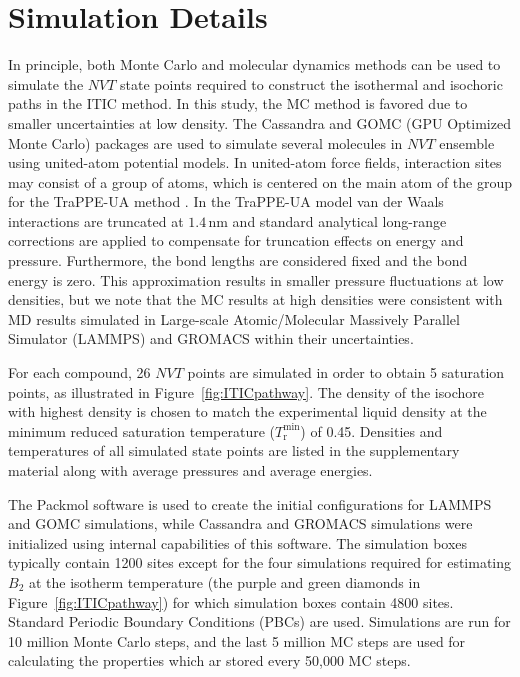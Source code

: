 \documentclass[5p,times]{elsarticle}
\begin{document}
\section{Simulation Details} \label{sec:SimDetail}
In principle, both Monte Carlo and molecular dynamics methods can be used to simulate the $NVT$ state points required to construct the isothermal and isochoric paths in the ITIC method. In this study, the MC method is favored due to smaller uncertainties at low density. The Cassandra \cite{Shah2017} and GOMC (GPU Optimized Monte Carlo) \cite{Mick2013} packages are used to simulate several molecules in $NVT$ ensemble using united-atom potential models. In united-atom force fields, interaction sites may consist of a group of atoms, which is centered on the main atom of the group for the TraPPE-UA method \cite{Smit1998}. In the TraPPE-UA model van der Waals interactions are truncated at $1.4\,\mathrm{nm}$ and standard analytical long-range corrections are applied to compensate for truncation effects on energy and pressure\cite{allen2017}. Furthermore, the bond lengths are considered fixed and the bond energy is zero. This approximation results in smaller pressure fluctuations at low densities, but we note that the MC results at high densities were consistent with MD results simulated in Large-scale Atomic/Molecular Massively Parallel Simulator (LAMMPS) \cite{Plimpton2007} and GROMACS \cite{Lindahl2001} within their uncertainties.

For each compound, 26 $NVT$ points are simulated in order to obtain 5 saturation points, as illustrated in Figure~\ref{fig:ITICpathway}. The density of the isochore with highest density is chosen to match the experimental liquid density at the minimum reduced saturation temperature ($T_\mathrm{r}^\mathrm{min}$) of 0.45. Densities and temperatures of all simulated state points are listed in the supplementary material along with average pressures and average energies.

The Packmol \cite{martinez2009packmol} software is used to create the initial configurations for LAMMPS and GOMC simulations, while Cassandra and GROMACS simulations were initialized using internal capabilities of this software. The simulation boxes typically contain 1200 sites except for the four simulations required for estimating $B_2$ at the isotherm temperature (the purple and green diamonds in Figure~\ref{fig:ITICpathway}) for which simulation boxes contain 4800 sites. Standard Periodic Boundary Conditions (PBCs) are used. Simulations are run for 10 million Monte Carlo steps, and the last 5 million MC steps are used for calculating the properties which ar stored every 50,000 MC steps. 
\end{document}
